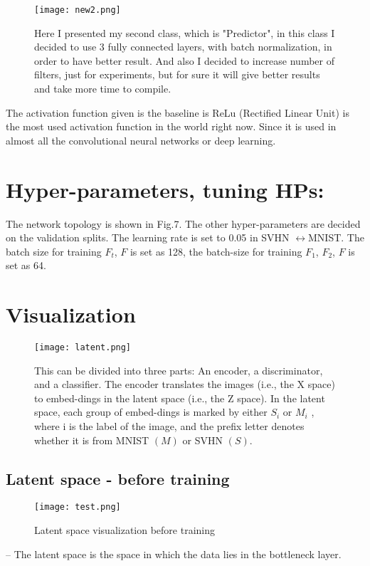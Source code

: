 \documentclass{article}
\begin{document}
\begin{figure}[h!]
\centering
\texttt{[image: new2.png]}
\caption{ Here I presented my second class, which is "Predictor", in this class I decided to use 3 fully connected layers, with batch normalization, in order to have better result. And also I decided to increase number of filters, just for experiments, but for sure it will give better results and take more time to compile. }
\label{fig:new2}
\end{figure}
The activation function given is the baseline is ReLu (Rectified Linear Unit) is the most used activation function in the world right now. Since it is used in almost all the convolutional neural networks or deep learning.


\section{Hyper-parameters, tuning HPs:}
The network topology is shown in Fig.7. The other hyper-parameters are decided on the validation splits. The learning rate is set to 0.05 in SVHN $\leftrightarrow$MNIST. The batch size for training $F_t$, $F$ is set as 128, the batch-size for training $F_1$, $F_2$, $F$ is set as 64.

\section{Visualization}

\begin{figure}[h!]
\centering
\texttt{[image: latent.png]}
\caption{\citep{one} This can be divided into three parts: An encoder, a discriminator, and a classifier. The encoder translates the images (i.e., the X space) to embed-dings in the latent space (i.e., the Z space). In the latent space, each group of embed-dings is marked by either  $S_i$  or  $M_i$ , where i is the label of the image, and the prefix letter denotes whether it is from MNIST $(M)$ or SVHN $(S)$. }
\label{fig:latent}
\end{figure}

\subsection{Latent space - before training}
\begin{wrapfigure}{l}{0.4\textwidth}
\texttt{[image: test.png]} 
\caption{Latent space visualization before training}
\label{fig:wrapfig}
\end{wrapfigure}
--\newline
The latent space is the space in which the data lies in the bottleneck layer.\citep{six}
\end{document}
